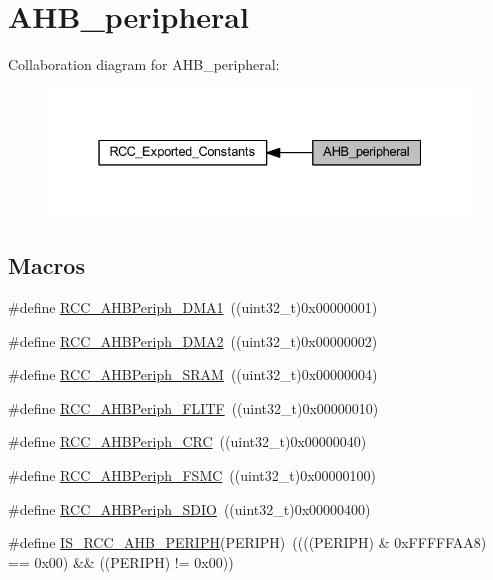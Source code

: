 \hypertarget{group___a_h_b__peripheral}{}\section{A\+H\+B\+\_\+peripheral}
\label{group___a_h_b__peripheral}
Collaboration diagram for A\+H\+B\+\_\+peripheral\+:
\nopagebreak
\begin{figure}[H]
\begin{center}
\leavevmode
\includegraphics[width=331pt]{group___a_h_b__peripheral}
\end{center}
\end{figure}
\subsection*{Macros}
\begin{DoxyCompactItemize}
\item 
\#define \hyperlink{group___a_h_b__peripheral_gaf32783f8481c4343726994073918b3ff}{R\+C\+C\+\_\+\+A\+H\+B\+Periph\+\_\+\+D\+M\+A1}~((uint32\+\_\+t)0x00000001)
\item 
\#define \hyperlink{group___a_h_b__peripheral_ga5afb68e40dc0b0f1aa00466e49bc9e70}{R\+C\+C\+\_\+\+A\+H\+B\+Periph\+\_\+\+D\+M\+A2}~((uint32\+\_\+t)0x00000002)
\item 
\#define \hyperlink{group___a_h_b__peripheral_ga8aec305b766b1c0ae297f8e1be103bd1}{R\+C\+C\+\_\+\+A\+H\+B\+Periph\+\_\+\+S\+R\+AM}~((uint32\+\_\+t)0x00000004)
\item 
\#define \hyperlink{group___a_h_b__peripheral_ga4277d70aa6b5e0b1ec6c8fb8180aac08}{R\+C\+C\+\_\+\+A\+H\+B\+Periph\+\_\+\+F\+L\+I\+TF}~((uint32\+\_\+t)0x00000010)
\item 
\#define \hyperlink{group___a_h_b__peripheral_gaef0cd08bcf96323324f328675ccd5ac3}{R\+C\+C\+\_\+\+A\+H\+B\+Periph\+\_\+\+C\+RC}~((uint32\+\_\+t)0x00000040)
\item 
\#define \hyperlink{group___a_h_b__peripheral_ga857dbf7044a974efb142c4450eafd609}{R\+C\+C\+\_\+\+A\+H\+B\+Periph\+\_\+\+F\+S\+MC}~((uint32\+\_\+t)0x00000100)
\item 
\#define \hyperlink{group___a_h_b__peripheral_gaa2664a55eedcedff22532982ae753566}{R\+C\+C\+\_\+\+A\+H\+B\+Periph\+\_\+\+S\+D\+IO}~((uint32\+\_\+t)0x00000400)
\item 
\#define \hyperlink{group___a_h_b__peripheral_ga5fbf97a9c9f5742c94cde6ffe389aedc}{I\+S\+\_\+\+R\+C\+C\+\_\+\+A\+H\+B\+\_\+\+P\+E\+R\+I\+PH}(P\+E\+R\+I\+PH)~((((P\+E\+R\+I\+PH) \& 0x\+F\+F\+F\+F\+F\+A\+A8) == 0x00) \&\& ((\+P\+E\+R\+I\+P\+H) != 0x00))
\end{DoxyCompactItemize}


